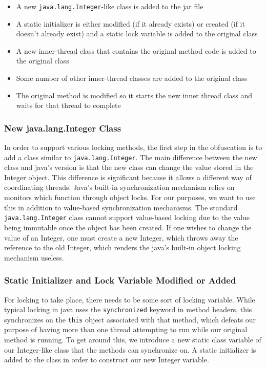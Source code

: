 \begin{itemize}
  \item A new \texttt{java.lang.Integer}-like class is added to the jar file
  \item A static initializer is either modified (if it already exists) or
        created (if it doesn't already exist) and a static lock variable is
        added to the original class
  \item A new inner-thread class that contains the original method code is
        added to the original class
  \item Some number of other inner-thread classes are added to the original
        class
  \item The original method is modified so it starts the new inner thread
        class and waits for that thread to complete
\end{itemize}

\subsubsection{New java.lang.Integer Class}
In order to support various locking methods, the first step in the obfuscation
is to add a class similar to \texttt{java.lang.Integer}.  The main difference
between the new class and java's version is that the new class can change the
value stored in the Integer object.  This difference is significant because it
allows a different way of coordinating threads.  Java's built-in
synchronization mechanism relies on monitors which function through object
locks.  For our purposes, we want to use this in addition to value-based
synchronization mechanisms.  The standard \texttt{java.lang.Integer} class
cannot support value-based locking due to the value being immutable once the object has been
created.  If one wishes to change the value of an Integer, one must create a
new Integer, which throws away the reference to the old Integer, which renders
the java's built-in object locking mechanism useless.

\subsubsection{Static Initializer and Lock Variable Modified or Added}
For locking to take place, there needs to be some sort of locking variable.
While typical locking in java uses the \texttt{synchronized} keyword in method
headers, this synchronizes on the \texttt{this} object associated with that
method, which defeats our purpose of having more than one thread attempting
to run while our original method is running.  To get around this, we introduce
a new static class variable of our Integer-like class that the methods can
synchronize on.  A static initializer is added to the class in order to
construct our new Integer variable.

